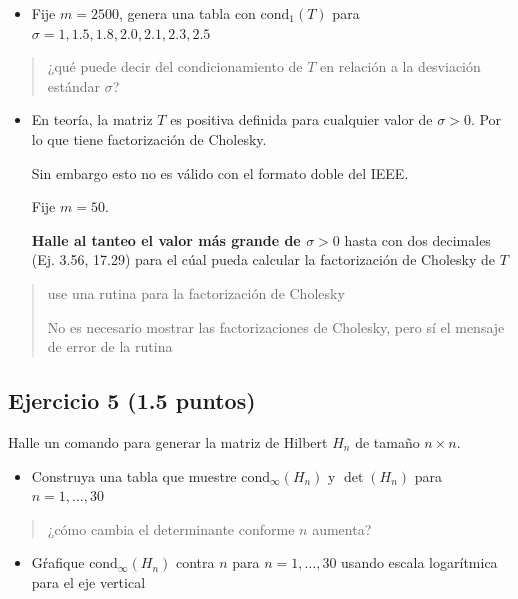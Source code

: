 \documentclass[11pt]{article}
\providecommand{\tightlist}{%
      \setlength{\itemsep}{0pt}\setlength{\parskip}{0pt}}
\begin{document}
    \begin{itemize}
\tightlist
\item
   Fije \(m=2500\), genera una tabla con \(\text{cond}_1(T)\) para
  \(\sigma=1,1.5,1.8,2.0,2.1,2.3,2.5\) 
\end{itemize}

    \begin{quote}
 ¿qué puede decir del condicionamiento de \(T\) en relación a la
desviación estándar \(\sigma\)?
\end{quote}

    \begin{itemize}
\tightlist
\item
   En teoría, la matriz \(T\) es positiva definida para cualquier valor
  de \(\sigma>0\). Por lo que tiene factorización de Cholesky. 
  
  Sin embargo esto no es válido con el formato doble del IEEE. 
 
  Fije  \(m=50\). 
  
  \textbf{Halle al tanteo el valor más grande de \(\sigma>0\)}
  hasta con dos decimales (Ej. 3.56, 17.29) para el cúal pueda calcular
  la factorización de Cholesky de \(T\) 
\end{itemize}

    \begin{quote}
   use una rutina para la factorización de Cholesky 
 
   No es necesario mostrar las factorizaciones de Cholesky, pero sí el mensaje de error 
   de la rutina
\end{quote}

    \subsection{Ejercicio 5 (1.5 puntos)}\label{ejercicio-5}

 Halle un comando para generar la matriz de Hilbert \(H_n\) de tamaño
\(n\times n\).

\begin{itemize}
\tightlist
\item
   Construya una tabla que muestre \(\text{cond}_{\infty}(H_n)\) y
  \(\det(H_n)\) para \(n=1,\dots,30\) 
\end{itemize}

    \begin{quote}
¿cómo cambia el determinante conforme \(n\) aumenta?
\end{quote}

    \begin{itemize}
\tightlist
\item
   Gŕafique \(\text{cond}_{\infty}(H_n)\) contra \(n\) para
  \(n=1,\dots,30\) usando escala logarítmica para el eje vertical
\end{itemize}
\end{document}
